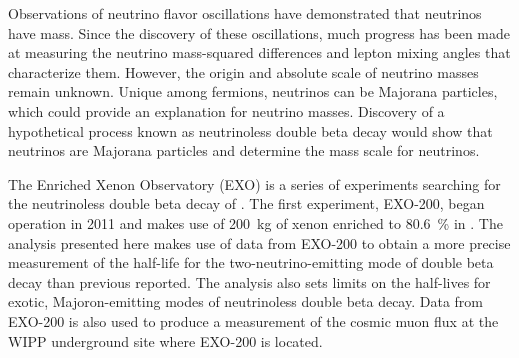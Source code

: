 Observations of neutrino flavor oscillations have demonstrated that neutrinos have mass. Since the discovery of these oscillations, much progress has been made at measuring the neutrino mass-squared differences and lepton mixing angles that characterize them. However, the origin and absolute scale of neutrino masses remain unknown. Unique among fermions, neutrinos can be Majorana particles, which could provide an explanation for neutrino masses. Discovery of a hypothetical process known as neutrinoless double beta decay would show that neutrinos are Majorana particles and determine the mass scale for neutrinos.

The Enriched Xenon Observatory (EXO) is a series of experiments searching for the neutrinoless double beta decay of . The first experiment, EXO-200, began operation in 2011 and makes use of \SI{200}{\kg} of xenon enriched to \SI{80.6}{\percent} in . The analysis presented here makes use of data from EXO-200 to obtain a more precise measurement of the half-life for the two-neutrino-emitting mode of double beta decay than previous reported. The analysis also sets limits on the half-lives for exotic, Majoron-emitting modes of neutrinoless double beta decay. Data from EXO-200 is also used to produce a measurement of the cosmic muon flux at the WIPP underground site where EXO-200 is located.
